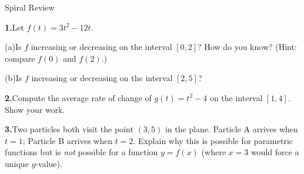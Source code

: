 \documentclass[10pt]{article}
\begin{document}
\namedateperiod

\vspace{0.12in}

\begin{notesbox}{Spiral Review}

\textbf{1.}\quad Let $f(t) = 3t^2 - 12t$.

\vspace{4pt}
(a)\quad Is $f$ increasing or decreasing on the interval $[0, 2]$?
How do you know? (Hint: compare $f(0)$ and $f(2)$.)


\vspace{4pt}
(b)\quad Is $f$ increasing or decreasing on the interval $[2, 5]$?

\writeline

\vspace{0.14in}
\textbf{2.}\quad Compute the average rate of change of $g(t) = t^2 - 4$
on the interval $[1, 4]$. Show your work.


\vspace{0.14in}
\textbf{3.}\quad Two particles both visit the point $(3, 5)$ in the plane.
Particle A arrives when $t = 1$; Particle B arrives when $t = 2$.
Explain why this is possible for parametric functions but is
\emph{not} possible for a function $y = f(x)$ (where $x = 3$
would force a unique $y$-value).


\end{notesbox}
\end{document}

